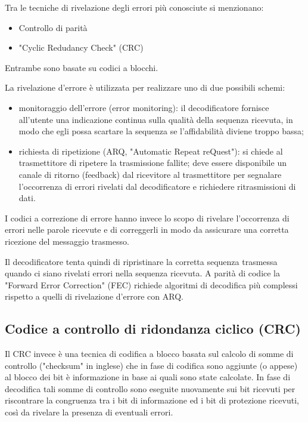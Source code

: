 \documentclass[LaM,binding=0.6cm,oneside]{../sapthesis}
\begin{document}
Tra le tecniche di rivelazione degli errori più conosciute si menzionano:
\begin{itemize}
    \item Controllo di parità
    \item "Cyclic Redudancy Check" (CRC)
\end{itemize}

Entrambe sono basate su codici a blocchi.

La rivelazione d'errore è utilizzata per realizzare uno di due possibili schemi:
\begin{itemize}
    \item monitoraggio dell'errore (error monitoring): il decodificatore fornisce all'utente una indicazione continua sulla qualità della sequenza ricevuta, in modo che egli possa scartare la sequenza se l'affidabilità diviene troppo bassa;
    
    \item richiesta di ripetizione (ARQ, "Automatic Repeat reQuest"): si chiede al trasmettitore di ripetere la trasmissione fallite; deve essere disponibile un canale di ritorno (feedback) dal ricevitore al trasmettitore per segnalare l'occorrenza di errori rivelati dal decodificatore e richiedere ritrasmissioni di dati.
\end{itemize}


\newline
I codici a correzione di errore hanno invece lo scopo di rivelare l'occorrenza di errori nelle parole ricevute e di correggerli in modo da assicurare una corretta ricezione del messaggio trasmesso.

Il decodificatore tenta quindi di ripristinare la corretta sequenza trasmessa quando ci siano rivelati errori nella sequenza ricevuta. A parità di codice la "Forward Error Correction" (FEC) richiede algoritmi di decodifica più complessi rispetto a quelli di rivelazione d'errore con ARQ.


\subsection{Codice a controllo di ridondanza ciclico (CRC)}

Il CRC invece è una tecnica di codifica a blocco basata sul calcolo di somme di controllo ("checksum" in inglese) che in fase di codifica sono aggiunte (o appese) al blocco dei bit è informazione in base ai quali sono state calcolate. In fase di decodifica tali somme di controllo sono eseguite nuovamente sui bit ricevuti per riscontrare la congruenza tra i bit di informazione ed i bit di protezione ricevuti, così da rivelare la presenza di eventuali errori.
\end{document}
